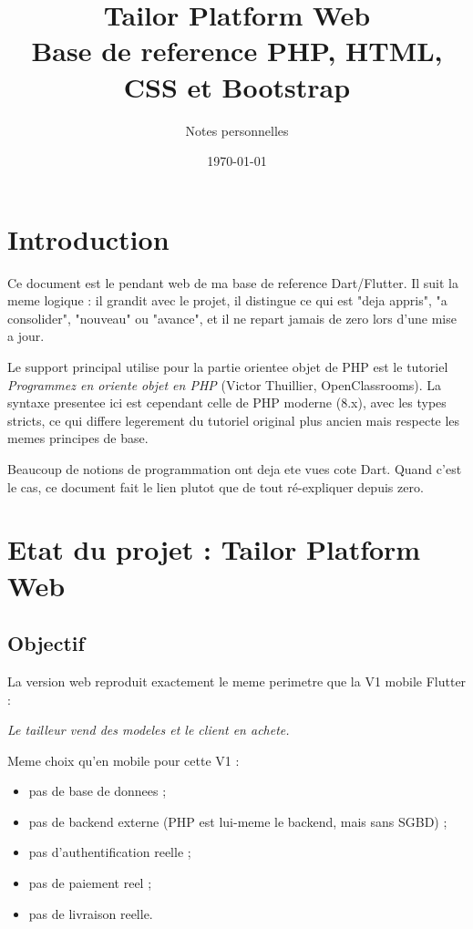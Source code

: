 \documentclass[11pt,a4paper]{article}
\title{Tailor Platform Web \\ Base de reference PHP, HTML, CSS et Bootstrap}
\author{Notes personnelles}
\date{\today}
\begin{document}
\maketitle
\tableofcontents
\newpage

\section{Introduction}

Ce document est le pendant web de ma base de reference Dart/Flutter. Il suit
la meme logique : il grandit avec le projet, il distingue ce qui est
"deja appris", "a consolider", "nouveau" ou "avance", et il ne repart jamais
de zero lors d'une mise a jour.

Le support principal utilise pour la partie orientee objet de PHP est le
tutoriel \textit{Programmez en oriente objet en PHP} (Victor Thuillier,
OpenClassrooms). La syntaxe presentee ici est cependant celle de PHP moderne
(8.x), avec les types stricts, ce qui differe legerement du tutoriel original
plus ancien mais respecte les memes principes de base.

Beaucoup de notions de programmation ont deja ete vues cote Dart. Quand
c'est le cas, ce document fait le lien plutot que de tout ré-expliquer
depuis zero.

\section{Etat du projet : Tailor Platform Web}

\subsection{Objectif}

La version web reproduit exactement le meme perimetre que la V1 mobile
Flutter :

\begin{center}
\textit{Le tailleur vend des modeles et le client en achete.}
\end{center}

Meme choix qu'en mobile pour cette V1 :

\begin{itemize}
  \item pas de base de donnees ;
  \item pas de backend externe (PHP est lui-meme le backend, mais sans SGBD) ;
  \item pas d'authentification reelle ;
  \item pas de paiement reel ;
  \item pas de livraison reelle.
\end{itemize}
\end{document}

